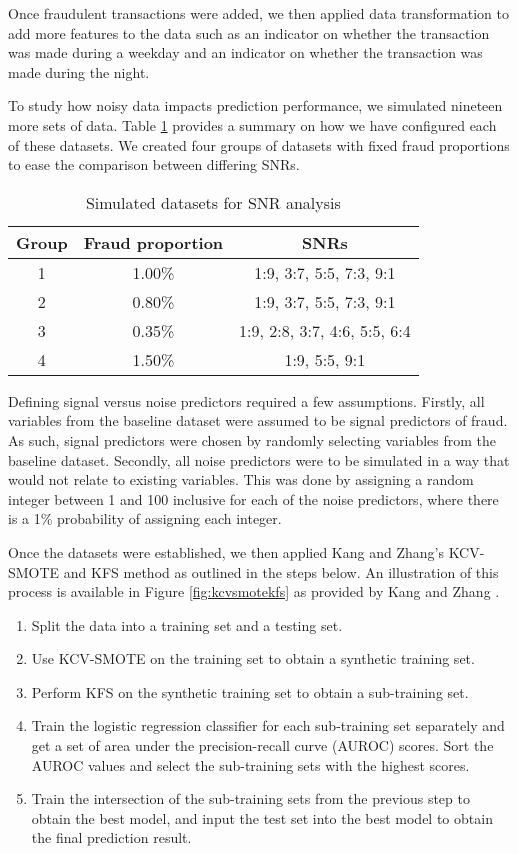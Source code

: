 \documentclass[a4paper, 12pt]{article}
\begin{document}
Once fraudulent transactions were added, we then applied data transformation to add more features to the data such as an indicator on whether the transaction was made during a weekday and an indicator on whether the transaction was made during the night.

To study how noisy data impacts prediction performance, we simulated nineteen more sets of data. Table \ref{snrSim} provides a summary on how we have configured each of these datasets. We created four groups of datasets with fixed fraud proportions to ease the comparison between differing SNRs. 

\begin{table}[H]
\centering
\caption{Simulated datasets for SNR analysis}
\label{snrSim}
    \begin{tabular}{c|c|c}
	\hline
		Group & Fraud proportion & SNRs \\
		\hline
            1 & 1.00\% & 1:9, 3:7, 5:5, 7:3, 9:1\\
		2 & 0.80\% & 1:9, 3:7, 5:5, 7:3, 9:1\\
            3 & 0.35\% & 1:9, 2:8, 3:7, 4:6, 5:5, 6:4\\
            4 & 1.50\% & 1:9, 5:5, 9:1\\
		\hline
    \end{tabular}
\end{table}

Defining signal versus noise predictors required a few assumptions. Firstly, all variables from the baseline dataset were assumed to be signal predictors of fraud. As such, signal predictors were chosen by randomly selecting variables from the baseline dataset. Secondly, all noise predictors were to be simulated in a way that would not relate to existing variables. This was done by assigning a random integer between 1 and 100 inclusive for each of the noise predictors, where there is a 1\% probability of assigning each integer.

Once the datasets were established, we then applied Kang and Zhang's \cite{kcvSmoteStudy} KCV-SMOTE and KFS method as outlined in the steps below. An illustration of this process is available in Figure \ref{fig:kcvsmotekfs} as provided by Kang and Zhang \cite{kcvSmoteStudy}. 

\begin{enumerate}
 \item Split the data into a training set and a testing set.
 \item Use KCV-SMOTE on the training set to obtain a synthetic training set. 
 \item Perform KFS on the synthetic training set to obtain a sub-training set.
 \item Train the logistic regression classifier for each sub-training set separately and get a set of area under the precision-recall curve (AUROC) scores. Sort the AUROC values and select the sub-training sets with the highest scores.
 \item Train the intersection of the sub-training sets from the previous step to obtain the best model, and input the test set into the best model to obtain the final prediction result.
\end{enumerate}
\end{document}
